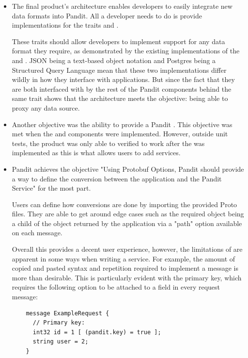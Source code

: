 \documentclass[a4paper,12pt]{report}
\begin{document}
\begin{itemize}
    \item The final product's architecture enables developers to easily integrate new data formats into Pandit. 
    All a developer needs to do is provide implementations for the traits  and .
    
    These traits should allow developers to implement support for any data format they require, as demonstrated by the existing implementations of the  and . 
    JSON being a text-based object notation and Postgres being a Structured Query Language mean that these two implementations differ wildly in how they interface with applications.
    But since the fact that they are both interfaced with by the rest of the Pandit components behind the same trait shows that the architecture meets the objective: being able to proxy any data source.
    
    \item Another objective was the ability to provide a Pandit . This objective was met when the  and  components were implemented. 
    However, outside unit tests, the product was only able to verified to work after the  was implemented as this is what allows users to add services.
    
    \item Pandit achieves the objective "Using Protobuf Options, Pandit should provide a way to define the conversion between the application and the Pandit Service" for the most part.
    
    Users can define how conversions are done by importing the provided Proto files. 
    They are able to get around edge cases such as the required object being a child of the object returned by the application via a "path" option available on each message.
    
    Overall this provides a decent user experience, however, the limitations of  are apparent in some ways when writing a service. 
    For example, the amount of copied and pasted syntax and repetition required to implement a message is more than desirable.
    This is particularly evident with the primary key, which requires the following option to be attached to a field in every request message:
    \begin{lstlisting}
    message ExampleRequest {
      // Primary key:
      int32 id = 1 [ (pandit.key) = true ];
      string user = 2;
    }
    \end{lstlisting}
    

\end{itemize}
\end{document}

